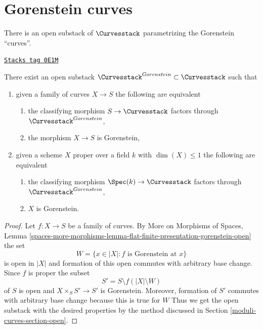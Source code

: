 \section{Gorenstein curves}
\label{moduli-curves-section-gorenstein}
There is an open substack of $\Curvesstack$ parametrizing
the Gorenstein ``curves''.

\begin{lemma}
\label{moduli-curves-lemma-gorenstein-curves}
\href{https://stacks.math.columbia.edu/tag/0E1M}{\texttt{Stacks tag 0E1M}}

There exist an open substack $\Curvesstack^{Gorenstein} \subset \Curvesstack$
such that
\begin{enumerate}
\item given a family of curves $X \to S$ the following are equivalent
\begin{enumerate}
\item the classifying morphism $S \to \Curvesstack$ factors
through $\Curvesstack^{Gorenstein}$,
\item the morphism $X \to S$ is Gorenstein,
\end{enumerate}
\item given a scheme $X$ proper over a field $k$ with $\dim(X) \leq 1$
the following are equivalent
\begin{enumerate}
\item the classifying morphism $\Spec(k) \to \Curvesstack$ factors
through $\Curvesstack^{Gorenstein}$,
\item $X$ is Gorenstein.
\end{enumerate}
\end{enumerate}
\end{lemma}

\begin{proof}
Let $f : X \to S$ be a family of curves. By
More on Morphisms of Spaces, Lemma
\ref{spaces-more-morphisms-lemma-flat-finite-presentation-gorenstein-open}
the set
$$
W = \{x \in |X| : f \text{ is Gorenstein at }x\}
$$
is open in $|X|$ and formation of this open commutes with arbitrary
base change. Since $f$ is proper the subset
$$
S' = S \setminus f(|X| \setminus W)
$$
of $S$ is open and $X \times_S S' \to S'$ is Gorenstein.
Moreover, formation of $S'$ commutes with arbitrary base
change because this is true for $W$
Thus we get the open substack with the desired properties
by the method discussed in Section \ref{moduli-curves-section-open}.
\end{proof}


